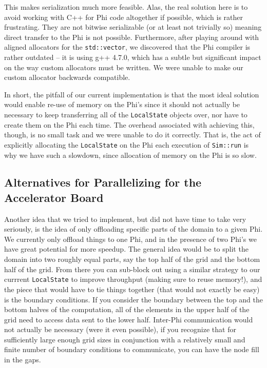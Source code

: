 This makes serialization much more feasible.  Alas, the real solution here is to avoid working with C++ for Phi code
altogether if possible, which is rather frustrating.  They are not bitwise serializable (or at least not trivially so)
meaning direct transfer to the Phi is not possible.  Furthermore, after playing around with aligned allocators for the
\texttt{std::vector}, we discovered that the Phi compiler is rather outdated -- it is using g++ 4.7.0, which has a subtle
but significant impact on the way custom allocators must be written.  We were unable to make our custom allocator
backwards compatible.

In short, the pitfall of our current implementation is that the most ideal solution would enable re-use of memory on the
Phi's since it should not actually be necessary to keep transferring all of the \texttt{LocalState} objects over, nor
have to create them on the Phi each time.  The overhead associated with achieving this, though, is no small task and
we were unable to do it correctly.  That is, the act of explicitly allocating the \texttt{LocalState} on the Phi each
execution of \texttt{Sim::run} is why we have such a slowdown, since allocation of memory on the Phi is so slow.

\subsection{Alternatives for Parallelizing for the Accelerator Board}
\label{sec-parallel-device-alternatives}

Another idea that we tried to implement, but did not have time to take very seriously, is the idea of only offloading
specific parts of the domain to a given Phi.  We currently only offload things to one Phi, and in the presence of two
Phi's we have great potential for more speedup.  The general idea would be to split the domain into two roughly equal
parts, say the top half of the grid and the bottom half of the grid.  From there you can sub-block out using a similar
strategy to our currrent \texttt{LocalState} to improve throughput (making sure to reuse memory!), and the piece that would have to tie things together
(that would not exactly be easy) is the boundary conditions.  If you consider the boundary between the top and the bottom
halves of the computation, all of the elements in the upper half of the grid need to access data sent to the lower half.
Inter-Phi communication would not actually be necessary (were it even possible), if you recognize that for sufficiently large
enough grid sizes in conjunction with a relatively small and finite number of boundary conditions to communicate, you
can have the node fill in the gaps.

